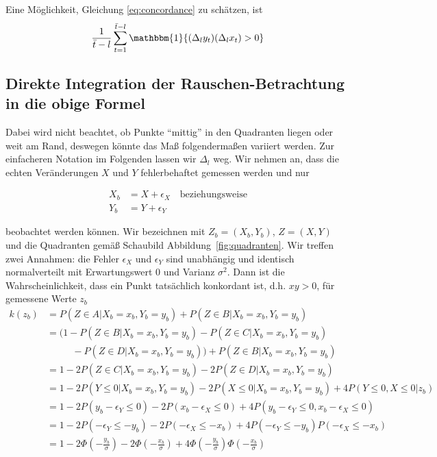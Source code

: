 \documentclass{article}
\theoremstyle{plain}%
\theoremstyle{definition}
\newcommand{\lag}[1][l]{\Delta_{#1}}
\newcommand{\tmax}{\bar{t}}
\newcommand{\ind}{\mathbbm{1}}
\begin{document}
Eine Möglichkeit, Gleichung \eqref{eq:concordance} zu schätzen, ist
\begin{equation}
  \frac{1}{\tmax - l} \sum_{t = 1}^{\tmax - l} \ind\{{(\lag y_t) (\lag x_t) > 0}\}
\end{equation}

\subsection{Direkte Integration der Rauschen-Betrachtung in die obige Formel}
Dabei wird nicht beachtet, ob Punkte \enquote{mittig} in den Quadranten liegen oder weit am Rand, deswegen könnte das Maß folgendermaßen variiert werden.
Zur einfacheren Notation im Folgenden lassen wir $\lag$ weg.
Wir nehmen an, dass die echten Veränderungen $X$ und $Y$ fehlerbehaftet gemessen werden und nur

\begin{align}
	X_b &= X + \epsilon_X \quad \text{beziehungsweise} \\
	Y_b &= Y + \epsilon_Y 
\end{align}

beobachtet werden können. 
Wir bezeichnen mit $Z_b = (X_b, Y_b)$, $Z = ( X, Y)$ und die Quadranten gemäß Schaubild Abbildung~\ref{fig:quadranten}. 
Wir treffen zwei Annahmen: die Fehler $\epsilon_X$ und $\epsilon_Y$ sind unabhängig und identisch normalverteilt mit Erwartungswert 0 und Varianz $\sigma^2$.
Dann ist die Wahrscheinlichkeit, dass ein Punkt tatsächlich konkordant ist, d.h. $xy > 0$, für gemessene Werte $z_b$
\begin{align*}
	k(z_b) &= P(Z \in A | X_b = x_b, Y_b = y_b) + P(Z \in B | X_b = x_b, Y_b = y_b) \\
	&= (1 - P(Z \in B | X_b = x_b, Y_b = y_b) - P(Z \in C |X_b = x_b, Y_b = y_b) \\
        &\phantom{==} - P(Z \in D |X_b = x_b, Y_b = y_b)) + P(Z \in B | X_b = x_b, Y_b = y_b) \\
	&= 1 - 2 P(Z \in C | X_b = x_b, Y_b = y_b) - 2 P(Z \in D | X_b = x_b, Y_b = y_b) \\
	&= 1 - 2 P(Y \leq 0 | X_b = x_b, Y_b = y_b) - 2 P(X \leq 0 | X_b = x_b, Y_b = y_b) + 4 P(Y \leq 0, X \leq 0| z_b) \\
	&= 1 - 2 P(y_b - \epsilon_Y \leq 0) - 2 P(x_b - \epsilon_X \leq 0) + 4 P(y_b - \epsilon_Y \leq 0, x_b -  \epsilon_X \leq 0) \\
	&= 1 - 2 P(- \epsilon_Y \leq - y_b) - 2 P(- \epsilon_X \leq -x_b) + 4 P(- \epsilon_Y \leq - y_b) P(-  \epsilon_X \leq - x_b) \\
	&= 1 - 2 \Phi(- \tfrac{y_b}{\sigma}) - 2 \Phi(- \tfrac{x_b}{\sigma}) + 4 \Phi(- \tfrac{y_b}{\sigma}) \Phi(- \tfrac{x_b}{\sigma})
\end{align*}
\end{document}
